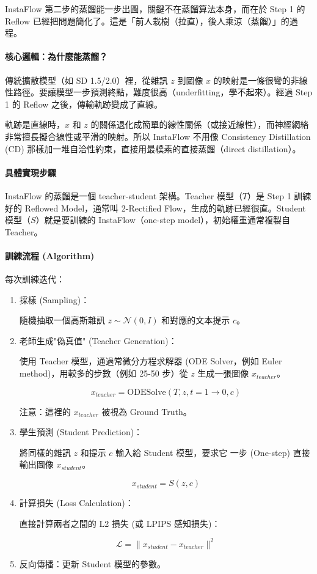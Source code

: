 InstaFlow 第二步的蒸餾能一步出圖，關鍵不在蒸餾算法本身，而在於 Step 1 的 Reflow 已經把問題簡化了。這是「前人栽樹（拉直），後人乘涼（蒸餾）」的過程。

\paragraph{核心邏輯：為什麼能蒸餾？}

傳統擴散模型（如 SD 1.5/2.0）裡，從雜訊 \(z\) 到圖像 \(x\) 的映射是一條很彎的非線性路徑。要讓模型一步預測終點，難度很高（underfitting，學不起來）。經過 Step 1 的 Reflow 之後，傳輸軌跡變成了直線。

軌跡是直線時，\(x\) 和 \(z\) 的關係退化成簡單的線性關係（或接近線性），而\colorbox{mdc2}{\textcolor{mdc1}{神經網絡非常擅長擬合線性或平滑的映射}}。所以 InstaFlow 不用像 Consistency Distillation (CD) 那樣加一堆自洽性約束，直接用最樸素的直接蒸餾（direct distillation）。

\paragraph{具體實現步驟}

InstaFlow 的蒸餾是一個 teacher-student 架構。Teacher 模型（\(T\)）是 Step 1 訓練好的 Reflowed Model，通常叫 2-Rectified Flow，生成的軌跡已經很直。Student 模型（\(S\)）就是要訓練的 InstaFlow（one-step model），初始權重通常複製自 Teacher。

\paragraph{訓練流程 (Algorithm)}

每次訓練迭代：

\begin{enumerate}
  \item 採樣 (Sampling)：
  
  隨機抽取一個高斯雜訊 \(z \sim \mathcal{N}(0, I)\) 和對應的文本提示 \(c\)。
  \item 老師生成\colorbox{mdc3}{\textcolor{mdc1}{"偽真值" (Teacher Generation)}}：
  
  使用 Teacher 模型，通過常微分方程求解器 (ODE Solver，例如 Euler method)，用較多的步數（例如 25-50 步）從 \(z\) 生成一張圖像 \(x_{teacher}\)。
  
  \[
  x_{teacher} = \text{ODESolve}(T, z, t=1 \rightarrow 0, c)
  \]
  
  注意：這裡的 \(x_{teacher}\) 被視為 Ground Truth。
  \item 學生預測 (Student Prediction)：
  
  將同樣的雜訊 \(z\) 和提示 \(c\) 輸入給 Student 模型，要求它 一步 (One-step) 直接輸出圖像 \(x_{student}\)。
  
  \[
  x_{student} = S(z, c)
  \]
  \item 計算損失 (Loss Calculation)：
  
  直接計算兩者之間的 L2 損失 (或 LPIPS 感知損失)：
  
  \[
  \mathcal{L} = \| x_{student} - x_{teacher} \|^2
  \]
  \item 反向傳播：更新 Student 模型的參數。
\end{enumerate}

